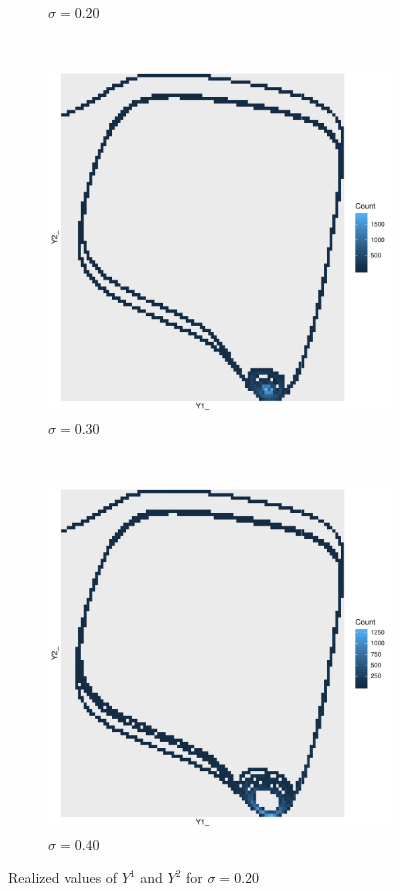 \documentclass[a4paper]{article}
\begin{document}
\begin{figure}[ht!]
\begin{subfigure}[b]{0.45\textwidth}
        \caption{$\sigma = 0.20$}
    \end{subfigure}
    ~
    \begin{subfigure}[b]{0.45\textwidth}
        \includegraphics[width=\textwidth]{part1b-sigma3-grid.pdf}
        \caption{$\sigma = 0.30$}
    \end{subfigure}
    ~
    \begin{subfigure}[b]{0.45\textwidth}
        \includegraphics[width=\textwidth]{part1b-sigma4-grid.pdf}
        \caption{$\sigma = 0.40$}
    \end{subfigure}
    \caption{Realized values of $Y^1$ and $Y^2$ for $\sigma = 0.20$}\label{fig:part1b-grid}
\end{figure}
\clearpage
\end{document}
